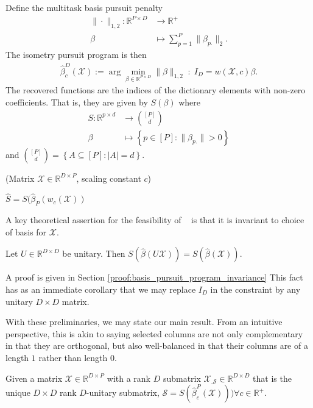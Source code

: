 Define the multitask basis pursuit penalty  %
\begin{align}
\label{eq:bp}
\| \cdot \|_{1,2}: \mathbb R^{P \times D} &\to \mathbb R^+ \\ 
\beta &\mapsto  \sum_{p=1}^P  \|\beta_{p.}\|_2.
\end{align}
The isometry pursuit program is then
\begin{align}
\label{prog:isometry_pursuit}
\widehat \beta^{D}_c (\mathcal X)  := \arg \min_{\beta \in \mathbb R^{P \times D}} \| \beta \|_{1,2} \; : \; I_D = w ({ \mathcal X}, c) \beta.
\end{align}
The recovered functions are the indices of the dictionary elements with non-zero coefficients.
That is, they are given by $S(\beta)$ where 
\begin{align}
S: \mathbb{R}^{p \times d} &\to \binom{[P]}{d} \\
\beta &\mapsto \left\{ p \in [P] :  \|\beta_{p.}\| > 0 \right\}
\end{align}
and $\binom{[P]}{d} = \left\{ A \subseteq [P] : \left|A\right| = d \right\}$. 
\begin{algorithm}[H]
\caption{\isometrypursuit(Matrix $\mathcal X \in \mathbb R^{D\times P}$, scaling constant $c$)}
\begin{algorithmic}[1]
 $\widehat S= S (\widehat \beta_P(w_c(\mathcal X))$ 
\end{algorithmic}
\end{algorithm}

A key theoretical assertion for the feasibility of \isometrypursuit~ is that it is invariant to choice of basis for $\mathcal X$.
\begin{proposition}
\label{prop:basis_pursuit_selection_invariance}
Let $U \in \mathbb R^{D \times D}$ be unitary.
 Then $S(\widehat \beta  (U \mathcal X)) = S(\widehat \beta (\mathcal X))$.
\end{proposition}
A proof is given in Section \ref{proof:basis_pursuit_program_invariance}
This fact has as an immediate corollary that we may replace $I_D$ in the constraint by any unitary $D \times D$ matrix.

With these preliminaries, we may state our main result.
From an intuitive perspective, this is akin to saying selected columns are not only complementary in that they are orthogonal, but also well-balanced in that their columns are of a length $1$ rather than length $0$.
\begin{proposition}
\label{prop:unitary_selection}
Given a matrix $\mathcal X \in \mathbb R^{D \times P}$ with a rank $D$ submatrix $\mathcal X_{.\mathcal S} \in \mathbb R^{D \times D}$ that is the unique $D \times D$ rank $D$-unitary submatrix, $\mathcal S = S(\widehat{\beta}_c^P (\mathcal X))) \forall c \in \mathbb R^+$.
 \end{proposition}
 
